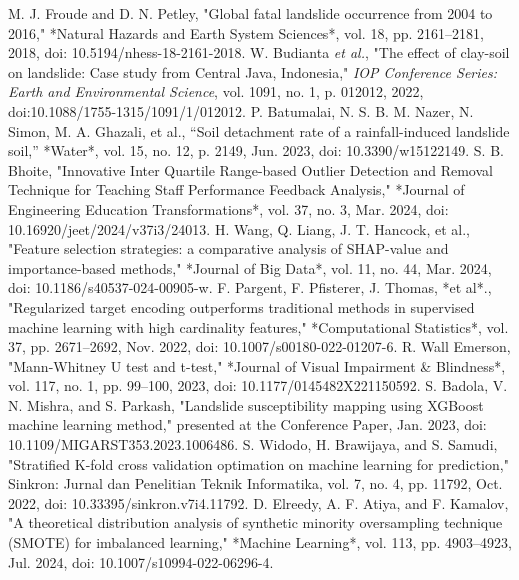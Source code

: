 \documentclass[conference]{IEEEtran}
\begin{document}







\begin{thebibliography}{00}
 M. J. Froude and D. N. Petley, "Global fatal landslide occurrence from 2004 to 2016," *Natural Hazards and Earth System Sciences*, vol. 18, pp. 2161–2181, 2018, doi: 10.5194/nhess-18-2161-2018.
 W. Budianta \emph{et al.}, "The effect of clay-soil on landslide: Case study from Central Java, Indonesia," \emph{IOP Conference Series: Earth and Environmental Science}, vol. 1091, no. 1, p. 012012, 2022, doi:10.1088/1755-1315/1091/1/012012.
 P. Batumalai, N. S. B. M. Nazer, N. Simon, M. A. Ghazali, et al., “Soil detachment rate of a rainfall-induced landslide soil,” *Water*, vol. 15, no. 12, p. 2149, Jun. 2023, doi: 10.3390/w15122149.
 S. B. Bhoite, "Innovative Inter Quartile Range-based Outlier Detection and Removal Technique for Teaching Staff Performance Feedback Analysis," *Journal of Engineering Education Transformations*, vol. 37, no. 3, Mar. 2024, doi: 10.16920/jeet/2024/v37i3/24013.
 H. Wang, Q. Liang, J. T. Hancock, et al., "Feature selection strategies: a comparative analysis of SHAP-value and importance-based methods," *Journal of Big Data*, vol. 11, no. 44, Mar. 2024, doi: 10.1186/s40537-024-00905-w.
 F. Pargent, F. Pfisterer, J. Thomas, *et al*., "Regularized target encoding outperforms traditional methods in supervised machine learning with high cardinality features," *Computational Statistics*, vol. 37, pp. 2671–2692, Nov. 2022, doi: 10.1007/s00180-022-01207-6.
 R. Wall Emerson, "Mann-Whitney U test and t-test," *Journal of Visual Impairment \& Blindness*, vol. 117, no. 1, pp. 99–100, 2023, doi: 10.1177/0145482X221150592.
 S. Badola, V. N. Mishra, and S. Parkash, "Landslide susceptibility mapping using XGBoost machine learning method," presented at the Conference Paper, Jan. 2023, doi: 10.1109/MIGARST353.2023.1006486.
 S. Widodo, H. Brawijaya, and S. Samudi, "Stratified K-fold cross validation optimation on machine learning for prediction," Sinkron: Jurnal dan Penelitian Teknik Informatika, vol. 7, no. 4, pp. 11792, Oct. 2022, doi: 10.33395/sinkron.v7i4.11792.
 D. Elreedy, A. F. Atiya, and F. Kamalov, "A theoretical distribution analysis of synthetic minority oversampling technique (SMOTE) for imbalanced learning," *Machine Learning*, vol. 113, pp. 4903–4923, Jul. 2024, doi: 10.1007/s10994-022-06296-4.

\end{thebibliography}
\end{document}
